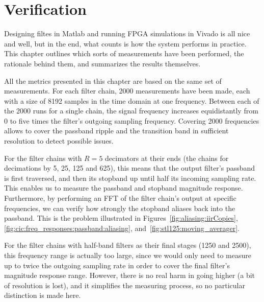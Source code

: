 %
%
%
%
\chapter{Verification} %
\label{ch:verification}

Designing  filtes in  Matlab and  running FPGA  simulations in  Vivado is  all
nice  and well,  but  in the  end,  what  counts is  how  the system  performs
in  practice. This chapter  outlines  which sorts  of  measurements have  been
performed, the rationale behind them, and summarizes the results themselves.

All  the  metrics  presented  in  this  chapter are  based  on  the  same  set
of  measurements. For each  filter  chain, \num{2000}  measurements have  been
made,  each with  a size  of  \num{8192} samples  in  the time  domain at  one
frequency. Between each of the \num{2000} runs  for a single chain, the signal
frequency  increases equidistantly  from \num{0}  to five  times the  filter's
outgoing sampling  frequency. Covering \num{2000} frequencies allows  to cover
the passband ripple and the transition band in sufficient resolution to detect
possible issues.

For the  filter chains  with $R=5$  decimators at their  ends (the  chains for
decimations by  \num{5}, \num{25}, \num{125}  and \num{625}), this  means that
the output  filter's passband  is first  traversed, and  then its  stopband up
until half its incoming sampling rate. This enables us to measure the passband
and  stopband magnitude  response. Furthermore, by  performing an  FFT of  the
filter chain's output at specific frequencies,  we can verify how strongly the
stopband aliases back into the passband. This is the problem illustrated in
Figures~\ref{fig:aliasing:iirCopies},
\ref{fig:cic:freq_responses:passband:aliasing},
and~\ref{fig:stl125:moving_averager}.

For the filter chains with half-band filters as their final stages (\num{1250}
and \num{2500}),  this frequency range is  actually too large, since  we would
only need to measure up to twice  the outgoing sampling rate in order to cover
the final filter's  magnitude response range.  However, there is  no real harm
in going higher (a bit of resolution is lost), and it simplifies the measuring
process, so no particular distinction is made here.


